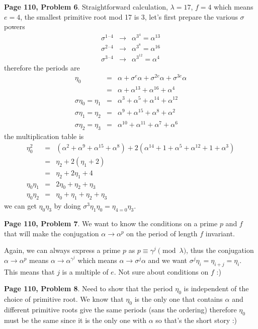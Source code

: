 \documentclass[aps,preprint,preprintnumbers,nofootinbib,showpacs,prd]{revtex4-1}
\newcommand{\nbea}{\begin{eqnarray*}}
\newcommand{\neea}{\end{eqnarray*}}
\begin{document}
{\bf Page 110, Problem 6}. Straightforward calculation, $\lambda = 17$, $f=4$ which means $e = 4$, the smallest primitive root mod 17 is 3, let's first prepare the various $\sigma$ powers
%
\nbea
\sigma^{1\cdot 4} & \to & \alpha^{3^4} = \alpha^{13} \\
\sigma^{2\cdot 4} & \to & \alpha^{3^8} = \alpha^{16} \\
\sigma^{3\cdot 4} & \to & \alpha^{3^{12}} = \alpha^4
\neea
% 
therefore the periods are
%
\nbea
\eta_0 & = & \alpha + \sigma^e \alpha + \sigma^{2e} \alpha + \sigma^{3e}\alpha \\
& = & \alpha + \alpha^{13} + \alpha^{16} + \alpha^{4} \\
\sigma \eta_0 = \eta_1 & = & \alpha^3 + \alpha^5 + \alpha^{14} + \alpha^{12} \\
\sigma \eta_1 = \eta_2 & = & \alpha^9 + \alpha^{15} + \alpha^{8} + \alpha^{2} \\
\sigma \eta_2 = \eta_3 & = & \alpha^{10} + \alpha^{11} + \alpha^{7} + \alpha^{6}
\neea
%
the multiplication table is
%
\nbea
\eta^2_0 & = & (\alpha^2 + \alpha^9 + \alpha^{15} + \alpha^{8}) + 2(\alpha^{14} + 1 + \alpha^{5} + \alpha^{12} + 1 + \alpha^{3}) \\
& = & \eta_2 + 2 (\eta_1 + 2) \\
& = & \eta_2 + 2\eta_1 + 4 \\
\eta_0\eta_1 & = & 2\eta_0 + \eta_2 + \eta_3 \\
\eta_0\eta_2 & = & \eta_0 + \eta_1 + \eta_2 + \eta_3
\neea
%
we can get $\eta_0\eta_3$ by doing $\sigma^{3} \eta_1\eta_0 = \eta_{4=0} \eta_3$.

{\bf Page 110, Problem 7}. We want to know the conditions on a prime $p$ and $f$ that will make the conjugation $\alpha \to \alpha^p$ on the period of length $f$ invariant.

Again, we can always express a prime $p$ as $p \equiv \gamma^j \pmod{\lambda}$, thus the conjugation $\alpha \to \alpha^p$ means $\alpha \to \alpha^{\gamma^j}$ which means $\alpha \to \sigma^{j}\alpha$ and we want $\sigma^j \eta_i = \eta_{i+j} = \eta_i$. This means that $j$ is a multiple of $e$. Not sure about conditions on $f$ :)

{\bf Page 110, Problem 8}. Need to show that the period $\eta_0$ is independent of the choice of primitive root. We know that $\eta_0$ is the only one that contains $\alpha$ and different primitive roots give the same periods (sans the ordering) therefore $\eta_0$ must be the same since it is the only one with $\alpha$ so that's the short story :)
\end{document}
